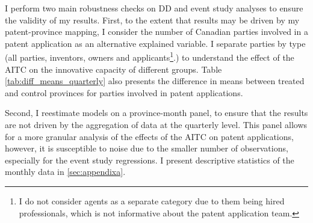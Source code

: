 \documentclass[../main.tex]{subfiles}
\begin{document}
I perform two main robustness checks on DD and event study analyses to ensure the validity of my results. First, to the extent that results may be driven by my patent-province mapping, I consider the number of Canadian parties involved in a patent application as an alternative explained variable. I separate parties by type (all parties, inventors, owners and applicants\footnote{I do not consider agents as a separate category due to them being hired professionals, which is not informative about the patent application team.}.) to understand the effect of the AITC on the innovative capacity of different groups. Table \ref{tab:diff_means_quarterly} also presents the difference in means between treated and control provinces for parties involved in patent applications.

Second, I reestimate models on a province-month panel, to ensure that the results are not driven by the aggregation of data at the quarterly level. This panel allows for a more granular analysis of the effects of the AITC on patent applications, however, it is susceptible to noise due to the smaller number of observations, especially for the event study regressions. I present descriptive statistics of the monthly data in \ref{sec:appendixa}. 
\end{document}
